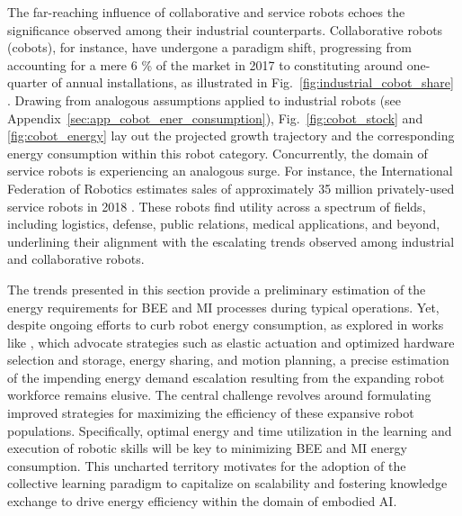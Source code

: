 \documentclass[12pt]{article}
\begin{document}
The far-reaching influence of collaborative and service robots echoes the significance observed among their industrial counterparts. Collaborative robots (cobots), for instance, have undergone a paradigm shift, progressing from accounting for a mere 6 \% of the market in 2017 to constituting around one-quarter of annual installations, as illustrated in Fig.~\ref{fig:industrial_cobot_share} \cite{tobe2015}. Drawing from analogous assumptions applied to industrial robots (see Appendix~\ref{sec:app_cobot_ener_consumption}), Fig.~\ref{fig:cobot_stock} and \ref{fig:cobot_energy} lay out the projected growth trajectory and the corresponding energy consumption within this robot category. Concurrently, the domain of service robots is experiencing an analogous surge. For instance, the International Federation of Robotics estimates sales of approximately 35 million privately-used service robots in 2018 \cite{IFR2015}. These robots find utility across a spectrum of fields, including logistics, defense, public relations, medical applications, and beyond, underlining their alignment with the escalating trends observed among industrial and collaborative robots.

The trends presented in this section provide a preliminary estimation of the energy requirements for BEE and MI processes during typical operations. Yet, despite ongoing efforts to curb robot energy consumption, as explored in works like \cite{schroder2014, chalmers2015, mohammed2014, chemnitz2011}, which advocate strategies such as elastic actuation and optimized hardware selection and storage, energy sharing, and motion planning, a precise estimation of the impending energy demand escalation resulting from the expanding robot workforce remains elusive. The central challenge revolves around formulating improved strategies for maximizing the efficiency of these expansive robot populations. Specifically, optimal energy and time utilization in the learning and execution of robotic skills will be key to minimizing BEE and MI energy consumption. This uncharted territory motivates for the adoption of the collective learning paradigm to capitalize on scalability and fostering knowledge exchange to drive energy efficiency within the domain of embodied AI.

\end{document}
